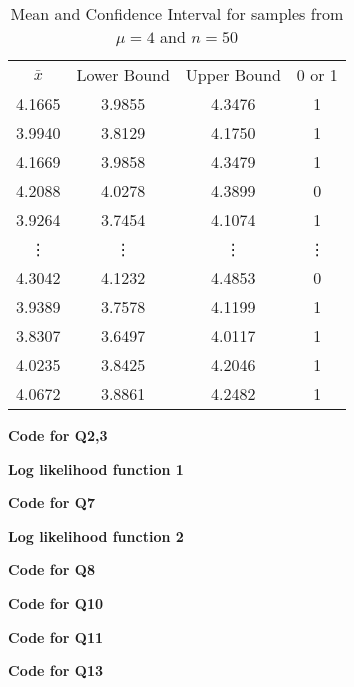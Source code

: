 \documentclass[12pt]{extarticle}
\begin{document}
\begin{table}[h!]

\caption{Mean and Confidence Interval for samples from $\mu = 4$ and $n=50$}
\centering
\begin{tabular}{cccc}
\\
$\bar{x}$ & Lower Bound & Upper Bound & 0 or 1 \\ [0.5ex]
4.1665 & 3.9855 & 4.3476 & 1 \\ 
3.9940 & 3.8129 & 4.1750 & 1 \\ 
4.1669 & 3.9858 & 4.3479 & 1 \\ 
4.2088 & 4.0278 & 4.3899 & 0 \\ 
3.9264 & 3.7454 & 4.1074 & 1 \\ 
\vdots & \vdots & \vdots & \vdots \\
4.3042 & 4.1232 & 4.4853 & 0 \\ 
3.9389 & 3.7578 & 4.1199 & 1 \\ 
3.8307 & 3.6497 & 4.0117 & 1 \\ 
4.0235 & 3.8425 & 4.2046 & 1 \\ 
4.0672 & 3.8861 & 4.2482 & 1 \\ 
\end{tabular}
\label{table:2}
\end{table}
\pagebreak

\begin{center}
\textbf{Code for Q2,3}
\end{center}


\begin{center}
\textbf{Log likelihood function 1}
\end{center}


\begin{center}
\textbf{Code for Q7}
\end{center}


\begin{center}
\textbf{Log likelihood function 2}
\end{center}

\pagebreak

\begin{center}
\textbf{Code for Q8}
\end{center}


\begin{center}
\textbf{Code for Q10}
\end{center}


\begin{center}
\textbf{Code for Q11}
\end{center}


\begin{center}
\textbf{Code for Q13}
\end{center}

\end{document}
